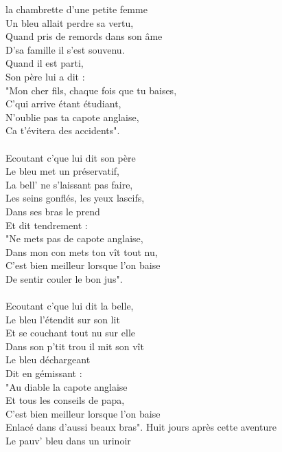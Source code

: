 
 la chambrette d'une petite femme
\\Un bleu allait perdre sa vertu,
\\Quand pris de remords dans son âme
\\D'sa famille il s'est souvenu.
\\Quand il est parti,
\\Son père lui a dit :
\\"Mon cher fils, chaque fois que tu baises,
\\C'qui arrive étant étudiant,
\\N'oublie pas ta capote anglaise,
\\Ca t'évitera des accidents".
\\\\Ecoutant c'que lui dit son père
\\Le bleu met un préservatif,
\\La bell' ne s'laissant pas faire,
\\Les seins gonflés, les yeux lascifs,
\\Dans ses bras le prend
\\Et dit tendrement :
\\"Ne mets pas de capote anglaise,
\\Dans mon con mets ton vît tout nu,
\\C'est bien meilleur lorsque l'on baise
\\De sentir couler le bon jus".
\\\\Ecoutant c'que lui dit la belle,
\\Le bleu l'étendit sur son lit
\\Et se couchant tout nu sur elle
\\Dans son p'tit trou il mit son vît
\\Le bleu déchargeant
\\Dit en gémissant :
\\"Au diable la capote anglaise
\\Et tous les conseils de papa,
\\C'est bien meilleur lorsque l'on baise
\\Enlacé dans d'aussi beaux bras".
\breakpage
Huit jours après cette aventure
\\Le pauv' bleu dans un urinoir
